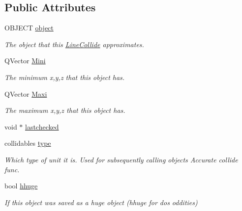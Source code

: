 \subsection*{Public Attributes}
\begin{DoxyCompactItemize}
\item 
O\+B\+J\+E\+CT \hyperlink{structLineCollide_ad5eed5f93fffe7f6a2d8e46659eb7748}{object}\hypertarget{structLineCollide_ad5eed5f93fffe7f6a2d8e46659eb7748}{}\label{structLineCollide_ad5eed5f93fffe7f6a2d8e46659eb7748}

\begin{DoxyCompactList}\small\item\em The object that this \hyperlink{structLineCollide}{Line\+Collide} approximates. \end{DoxyCompactList}\item 
Q\+Vector \hyperlink{structLineCollide_a0fb31e503f18410bd557df42cd2f97c6}{Mini}\hypertarget{structLineCollide_a0fb31e503f18410bd557df42cd2f97c6}{}\label{structLineCollide_a0fb31e503f18410bd557df42cd2f97c6}

\begin{DoxyCompactList}\small\item\em The minimum x,y,z that this object has. \end{DoxyCompactList}\item 
Q\+Vector \hyperlink{structLineCollide_a90ce83ba60ef7500e2c39d5ba781835c}{Maxi}\hypertarget{structLineCollide_a90ce83ba60ef7500e2c39d5ba781835c}{}\label{structLineCollide_a90ce83ba60ef7500e2c39d5ba781835c}

\begin{DoxyCompactList}\small\item\em The maximum x,y,z that this object has. \end{DoxyCompactList}\item 
void $\ast$ \hyperlink{structLineCollide_ad90845099647656b719f14a462044894}{lastchecked}
\item 
collidables \hyperlink{structLineCollide_ac80a4c0d0f329a6ce6f3a9cb8fcc9517}{type}\hypertarget{structLineCollide_ac80a4c0d0f329a6ce6f3a9cb8fcc9517}{}\label{structLineCollide_ac80a4c0d0f329a6ce6f3a9cb8fcc9517}

\begin{DoxyCompactList}\small\item\em Which type of unit it is. Used for subsequently calling object\textquotesingle{}s Accurate collide func. \end{DoxyCompactList}\item 
bool \hyperlink{structLineCollide_a600f6736e7d05ee0f555a99027169855}{hhuge}\hypertarget{structLineCollide_a600f6736e7d05ee0f555a99027169855}{}\label{structLineCollide_a600f6736e7d05ee0f555a99027169855}

\begin{DoxyCompactList}\small\item\em If this object was saved as a huge object (hhuge for dos oddities) \end{DoxyCompactList}\end{DoxyCompactItemize}


